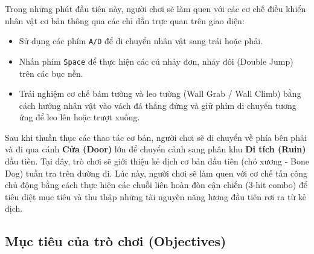 \documentclass[../DoAn.tex]{subfiles}
\begin{document}
Trong những phút đầu tiên này, người chơi sẽ làm quen với các cơ chế điều khiển nhân vật cơ bản thông qua các chỉ dẫn trực quan trên giao diện:
\begin{itemize}
    \item Sử dụng các phím \texttt{A/D} để di chuyển nhân vật sang trái hoặc phải.
    \item Nhấn phím \texttt{Space} để thực hiện các cú nhảy đơn, nhảy đôi (Double Jump) trên các bục nền.
    \item Trải nghiệm cơ chế bám tường và leo tường (Wall Grab / Wall Climb) bằng cách hướng nhân vật vào vách đá thẳng đứng và giữ phím di chuyển tương ứng để leo lên hoặc trượt xuống.
\end{itemize}

Sau khi thuần thục các thao tác cơ bản, người chơi sẽ di chuyển về phía bên phải và đi qua cánh \textbf{Cửa (Door)} lớn để chuyển cảnh sang phân khu \textbf{Di tích (Ruin)} đầu tiên. Tại đây, trò chơi sẽ giới thiệu kẻ địch cơ bản đầu tiên (chó xương - Bone Dog) tuần tra trên đường đi. Lúc này, người chơi sẽ làm quen với cơ chế tấn công chủ động bằng cách thực hiện các chuỗi liên hoàn đòn cận chiến (3-hit combo) để tiêu diệt mục tiêu và thu thập những tài nguyên năng lượng đầu tiên rơi ra từ kẻ địch.

\subsection{Mục tiêu của trò chơi (Objectives)}
\label{subsection:3.2.2}
\end{document}
